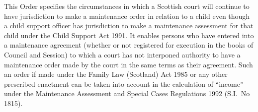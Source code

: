 \documentclass[12pt,a4paper]{article}
\begin{document}
This Order specifies the circumstances in which a Scottish court will continue to have jurisdiction to make a maintenance order in relation to a child even though a child support officer has jurisdiction to make a maintenance assessment for that child under the Child Support Act 1991. It enables persons who have entered into a maintenance agreement (whether or not registered for execution in the books of Council and Session) to which a court has not interponed authority to have a maintenance order made by the court in the same terms as their agreement. Such an order if made under the Family Law (Scotland) Act 1985 or any other prescribed enactment can be taken into account in the calculation of “income” under the Maintenance Assessment and Special Cases Regulations 1992 (S.I.\ No 1815).
\end{document}
